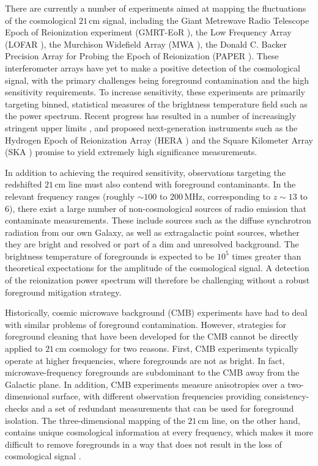 \documentclass[twocolumn,aps,prd,nofootinbib,showpacs]{revtex4-1}
\begin{document}
There are currently a number of experiments aimed at mapping the fluctuations of the cosmological $21\,\textrm{cm}$ signal, including the Giant Metrewave Radio Telescope Epoch of Reionization experiment (GMRT-EoR \cite{Paciga2013}), the Low Frequency Array (LOFAR \cite{Yatawatta2013}), the Murchison Widefield Array (MWA \cite{Tingay2013}), the Donald C. Backer Precision Array for Probing the Epoch of Reionization (PAPER \cite{Parsons2010}).  These interferometer arrays have yet to make a positive detection of the cosmological signal, with the primary challenges being foreground contamination and the high sensitivity requirements.  To increase sensitivity, these experiments are primarily targeting binned, statistical measures of the brightness temperature field such as the power spectrum.  Recent progress has resulted in a number of increasingly stringent upper limits \cite{Paciga2013,Dillon2014,Parsons2013}, and proposed next-generation instruments such as the Hydrogen Epoch of Reionization Array (HERA \cite{Pober2014}) and the Square Kilometer Array (SKA \cite{Mellema2013}) promise to yield extremely high significance measurements.

In addition to achieving the required sensitivity, observations targeting the redshifted $21\,\textrm{cm}$ line must also contend with foreground contaminants. In the relevant frequency ranges (roughly $\sim 100$ to $200\,\textrm{MHz}$, corresponding to $z\sim13$ to $6$), there exist a large number of non-cosmological sources of radio emission that contaminate measurements.  These include sources such as the diffuse synchrotron radiation from our own Galaxy, as well as extragalactic point sources, whether they are bright and resolved or part of a dim and unresolved background.  The brightness temperature of foregrounds is expected to be $10^5$ times greater than theoretical expectations for the amplitude of the cosmological signal.  A detection of the reionization power spectrum will therefore be challenging without a robust foreground mitigation strategy.

Historically, cosmic microwave background (CMB) experiments have had to deal with similar problems of foreground contamination.  However, strategies for foreground cleaning that have been developed for the CMB cannot be directly applied to $21\,\textrm{cm}$ cosmology for two reasons.  First, CMB experiments typically operate at higher frequencies, where foregrounds are not as bright.  In fact, microwave-frequency foregrounds are subdominant to the CMB away from the Galactic plane.  In addition, CMB experiments measure anisotropies over a two-dimensional surface, with different observation frequencies providing consistency-checks and a set of redundant measurements that can be used for foreground isolation.  The three-dimensional mapping of the $21\,\textrm{cm}$ line, on the other hand, contains unique cosmological information at every frequency, which makes it more difficult to remove foregrounds in a way that does not result in the loss of cosmological signal \cite{Liu2013}.
\end{document}
